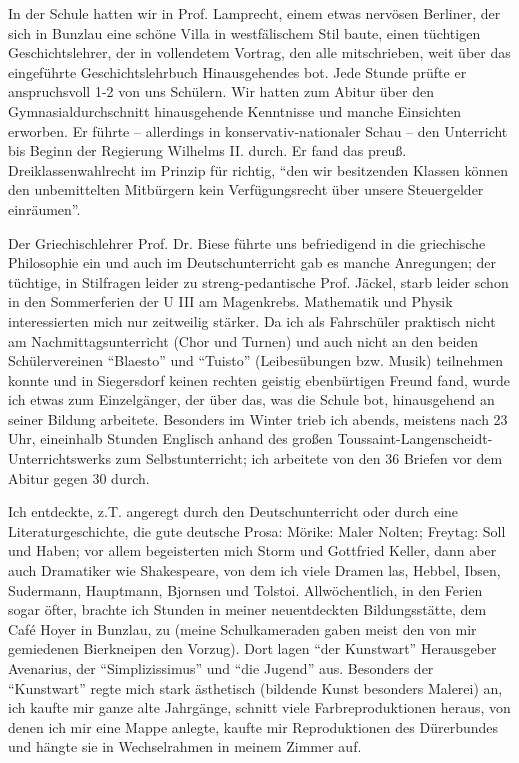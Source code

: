 In der Schule hatten wir in Prof. Lamprecht, einem etwas nervösen Berliner, der sich in Bunzlau eine schöne Villa in westfälischem Stil baute, einen tüchtigen Geschichtslehrer, der in vollendetem Vortrag, den alle mitschrieben, weit über das eingeführte Geschichtslehrbuch Hinausgehendes bot. Jede Stunde prüfte er anspruchsvoll 1-2 von uns Schülern. Wir hatten zum Abitur über den Gymnasialdurchschnitt hinausgehende Kenntnisse und manche Einsichten erworben. Er führte -- allerdings in konservativ-nationaler Schau -- den Unterricht bis Beginn der Regierung Wilhelms II. durch. Er fand das preuß. Dreiklassenwahlrecht im Prinzip für richtig, \enquote{den wir besitzenden Klassen können den unbemittelten Mitbürgern kein Verfügungsrecht über unsere Steuergelder einräumen}.

Der Griechischlehrer Prof. Dr. Biese führte uns befriedigend in die griechische Philosophie ein und auch im Deutschunterricht gab es manche Anregungen; der tüchtige, in Stilfragen leider zu streng-pedantische Prof. Jäckel, starb leider schon in den Sommerferien der U III am Magenkrebs. Mathematik und Physik interessierten mich nur zeitweilig stärker. Da ich als Fahrschüler praktisch nicht am Nachmittagsunterricht (Chor und Turnen) und auch nicht an den beiden Schülervereinen \enquote{Blaesto} und \enquote{Tuisto} (Leibesübungen bzw. Musik) teilnehmen konnte und in Siegersdorf keinen rechten geistig ebenbürtigen Freund fand, wurde ich etwas zum Einzelgänger, der über das, was die Schule bot, hinausgehend an seiner Bildung arbeitete. Besonders im Winter trieb ich abends, meistens nach 23 Uhr, eineinhalb Stunden Englisch anhand des großen Toussaint-Langenscheidt-Unterrichtswerks zum Selbstunterricht; ich arbeitete von den 36 Briefen vor dem Abitur gegen 30 durch.

Ich entdeckte, z.T. angeregt durch den Deutschunterricht oder durch eine Literaturgeschichte, die gute deutsche Prosa: Mörike: Maler Nolten; Freytag: Soll und Haben; vor allem begeisterten mich Storm und Gottfried Keller, dann aber auch Dramatiker wie Shakespeare, von dem ich viele Dramen las, Hebbel, Ibsen, Sudermann, Hauptmann, Bjornsen und Tolstoi. Allwöchentlich, in den Ferien sogar öfter, brachte ich Stunden in meiner neuentdeckten Bildungsstätte, dem Café Hoyer in Bunzlau, zu (meine Schulkameraden gaben meist den von mir gemiedenen Bierkneipen den Vorzug). Dort lagen \enquote{der Kunstwart} Herausgeber Avenarius, der \enquote{Simplizissimus} und \enquote{die Jugend} aus. Besonders der \enquote{Kunstwart} regte mich stark ästhetisch (bildende Kunst besonders Malerei) an, ich kaufte mir ganze alte Jahrgänge, schnitt viele Farbreproduktionen heraus, von denen ich mir eine Mappe anlegte, kaufte mir Reproduktionen des Dürerbundes und hängte sie in Wechselrahmen in meinem Zimmer auf.

